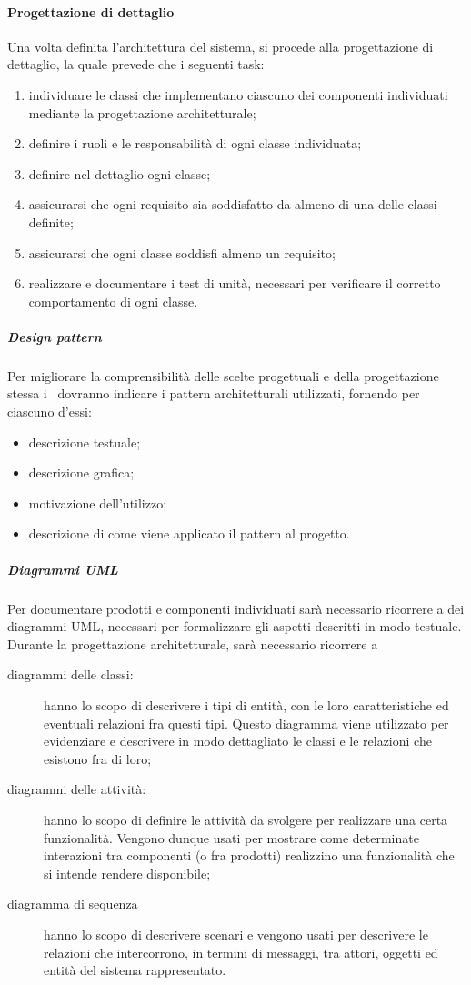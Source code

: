 \documentclass[../NormeProgetto.tex]{subfiles}
\begin{document}
		\paragraph{Progettazione di dettaglio}
			Una volta definita l'architettura del sistema, si procede alla progettazione di dettaglio, la quale prevede che i seguenti task:
			\begin{enumerate}
				\item individuare le classi che implementano ciascuno dei componenti individuati mediante la progettazione architetturale;
				\item definire i ruoli e le responsabilità di ogni classe individuata;
				\item definire nel dettaglio ogni classe;
				\item assicurarsi che ogni requisito sia soddisfatto da almeno di una delle classi definite;
				\item assicurarsi che ogni classe soddisfi almeno un requisito;
				\item realizzare e documentare i test di unità, necessari per verificare il corretto comportamento di ogni classe.
			\end{enumerate}
			
			\subparagraph{Design pattern}
				Per migliorare la comprensibilità delle scelte progettuali e della progettazione stessa i \progettisti\ dovranno indicare i pattern architetturali utilizzati, fornendo per ciascuno d'essi:
				\begin{itemize}
					\item descrizione testuale;
					\item descrizione grafica;
					\item motivazione dell'utilizzo;
					\item descrizione di come viene applicato il pattern al progetto.
				\end{itemize}
			\subparagraph{Diagrammi UML}
				Per documentare prodotti e componenti individuati sarà necessario ricorrere a dei diagrammi UML, necessari per formalizzare gli aspetti descritti in modo testuale. Durante la progettazione architetturale, sarà necessario ricorrere a 
				\begin{description}
					\item[diagrammi delle classi:] hanno lo scopo di descrivere i tipi di entità, con le loro caratteristiche ed eventuali relazioni fra questi tipi. Questo diagramma viene utilizzato per evidenziare e descrivere in modo dettagliato le classi e le relazioni che esistono fra di loro;
					\item[diagrammi delle attività:]  hanno lo scopo di definire le attività da svolgere per realizzare una certa funzionalità. Vengono dunque usati per mostrare come determinate interazioni tra componenti (o fra prodotti) realizzino una funzionalità che si intende rendere disponibile;
					\item[diagramma di sequenza] hanno lo scopo di descrivere scenari e vengono usati per descrivere le relazioni che intercorrono, in termini di messaggi, tra attori, oggetti ed entità del sistema rappresentato.
				\end{description}
			
\end{document}
